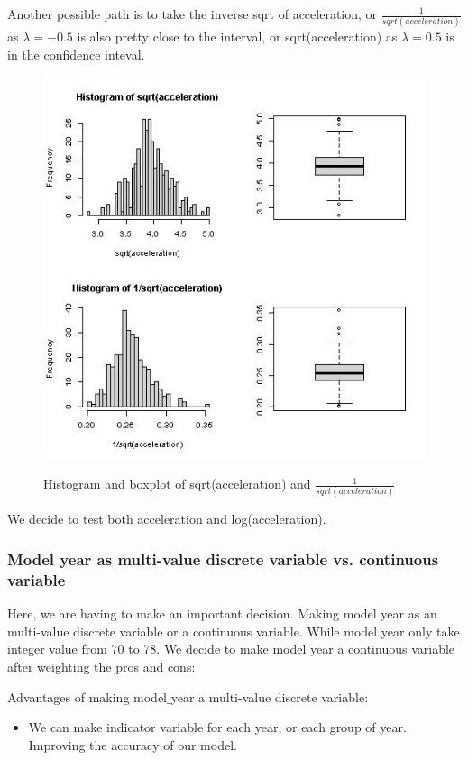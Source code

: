 Another possible path is to take the inverse sqrt of acceleration, or $\frac{1}{sqrt(acceleration)}$ as $\lambda = -0.5$ is also pretty close to the interval, or sqrt(acceleration) as $\lambda = 0.5$ is in the confidence inteval.

\begin{figure}[H]
\centering
\includegraphics[scale=0.7]{img/acceltrans2.jpeg}
\label{fig:my_label_with_H}
\caption{Histogram and boxplot of sqrt(acceleration) and $\frac{1}{sqrt(acceleration)}$}
\end{figure}

We decide to test both acceleration and log(acceleration).

\subsubsection{Model year as multi-value discrete variable vs. continuous variable}

Here, we are having to make an important decision. Making model year as an multi-value discrete variable or a continuous variable. While model year only take integer value from 70 to 78. We decide to make model year a continuous variable after weighting the pros and cons:

Advantages of making model$\_$year a multi-value discrete variable:
\begin{itemize}
    \item We can make indicator variable for each year, or each group of year. Improving the accuracy of our model.
\end{itemize}


